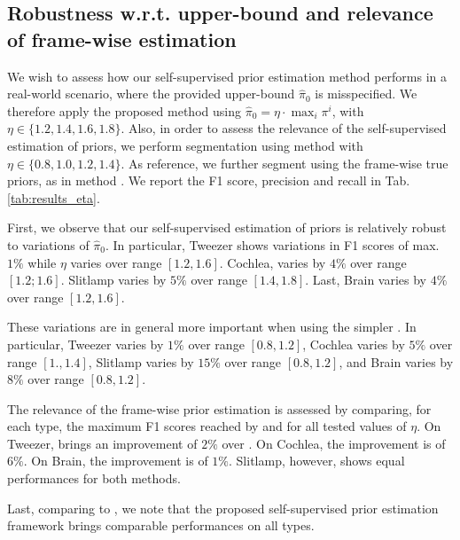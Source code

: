 \subsection{Robustness w.r.t. upper-bound and relevance of frame-wise estimation}
\label{sec:org1ddd2fc}
We wish to assess how our self-supervised prior estimation method performs in a real-world scenario, where the provided upper-bound $\hat \pi_{0}$ is misspecified.
We therefore apply the proposed method \kspss{} using $\hat \pi_{0}=\eta \cdot \max_{i}\pi^{i}$, with $\eta \in \{1.2, 1.4, 1.6, 1.8\}$.
Also, in order to assess the relevance of the self-supervised estimation of priors, we perform segmentation using method \kspconst{} with $\eta \in \{0.8, 1.0, 1.2, 1.4\}$.
As reference, we further segment using the frame-wise true priors, as in method \ksptrue{}.
We report the F1 score, precision and recall in Tab. \ref{tab:results_eta}.

First, we observe that our self-supervised estimation of priors is relatively robust to variations of $\hat \pi_{0}$.
In particular, Tweezer shows variations in F1 scores of max. $1\%$ while $\eta$ varies over range $[1.2, 1.6]$.
Cochlea, varies by $4\%$ over range $[1.2; 1.6]$.
Slitlamp varies by $5\%$ over range $[1.4, 1.8]$.
Last, Brain varies by $4\%$ over range $[1.2, 1.6]$.

These variations are in general more important when using the simpler \kspconst.
In particular, Tweezer varies by $1\%$ over range $[0.8, 1.2]$,
Cochlea varies by $5\%$ over range $[1., 1.4]$,
Slitlamp varies by $15\%$ over range $[0.8, 1.2]$,
and Brain varies by $8\%$ over range $[0.8, 1.2]$.

The relevance of the frame-wise prior estimation is assessed by comparing, for each type, the maximum F1 scores reached by \kspss{} and \kspconst{} for all tested values of $\eta$.
On Tweezer, \kspss{} brings an improvement of $2\%$ over \kspconst{}.
On Cochlea, the improvement is of $6\%$.
On Brain, the improvement is of $1\%$.
Slitlamp, however, shows equal performances for both methods.

Last, comparing \kspss{} to \ksptrue{}, we note that the proposed self-supervised prior estimation framework brings comparable performances on all types.




